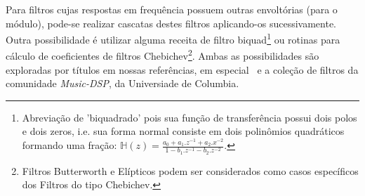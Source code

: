 \begin{itemize}
Para filtros cujas respostas em frequência possuem outras envoltórias (para o módulo),
pode-se realizar cascatas destes filtros aplicando-os sucessivamente.
Outra possibilidade é utilizar alguma receita de filtro
biquad\footnote{Abreviação
de 'biquadrado' pois sua função de transferência possui dois polos e dois zeros, i.e. sua
forma normal consiste em dois polinômios quadráticos formando uma fração:
$\mathbb{H}(z)=\frac{a_0+a_1.z^{-1}+a_2.x^{-2}}{1- b_1.z^{-1} -b_2 . z^{-2}}$.}
ou rotinas para cálculo de coeficientes
de filtros Chebichev\footnote{Filtros Butterworth e Elípticos podem
ser considerados como casos específicos dos Filtros do tipo Chebichev.\cite{Openheim,smith}}.
Ambas as possibilidades são exploradas
por títulos em nossas referências, em especial~\cite{JOSFM,smith} e a coleção de filtros da comunidade \emph{Music-DSP}, da Universiade de Columbia.\cite{music-dsp,Openheim}

\end{itemize}


